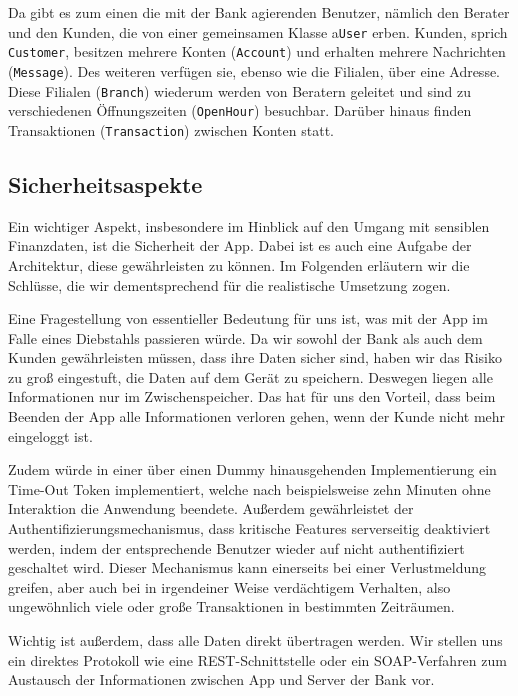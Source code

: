 	
	
	Da gibt es zum einen die mit der Bank agierenden Benutzer, nämlich den Berater und den Kunden, die von einer gemeinsamen Klasse a\texttt{User} erben. Kunden, sprich \texttt{Customer}, besitzen mehrere Konten (\texttt{Account}) und erhalten mehrere Nachrichten (\texttt{Message}). Des weiteren verfügen sie, ebenso wie die Filialen,  über eine Adresse. Diese Filialen (\texttt{Branch}) wiederum werden von Beratern geleitet und sind zu verschiedenen Öffnungszeiten (\texttt{OpenHour}) besuchbar. Darüber hinaus finden Transaktionen (\texttt{Transaction}) zwischen Konten statt.

\subsection{Sicherheitsaspekte}
%
	Ein wichtiger Aspekt, insbesondere im Hinblick auf den Umgang mit sensiblen Finanzdaten, ist die Sicherheit der App. Dabei ist es auch eine Aufgabe der Architektur, diese gewährleisten zu können. Im Folgenden erläutern wir die Schlüsse, die wir dementsprechend für die realistische Umsetzung zogen.
	
	Eine Fragestellung von essentieller Bedeutung für uns ist, was mit der App im Falle eines Diebstahls passieren würde. Da wir sowohl der Bank als auch dem Kunden gewährleisten müssen, dass ihre Daten sicher sind, haben wir das Risiko zu groß eingestuft, die Daten auf dem Gerät zu speichern. Deswegen liegen alle Informationen nur im Zwischenspeicher. Das hat für uns den Vorteil, dass beim Beenden der App alle Informationen verloren gehen, wenn der Kunde nicht mehr eingeloggt ist.
	
	Zudem würde in einer über einen Dummy hinausgehenden Implementierung ein Time-Out Token implementiert, welche nach beispielsweise zehn Minuten ohne Interaktion die Anwendung beendete. Außerdem gewährleistet der Authentifizierungsmechanismus, dass kritische Features serverseitig deaktiviert werden, indem der entsprechende Benutzer wieder auf nicht authentifiziert geschaltet wird. Dieser Mechanismus kann einerseits bei einer Verlustmeldung greifen, aber auch bei in irgendeiner Weise verdächtigem Verhalten, also ungewöhnlich viele oder große Transaktionen in bestimmten Zeiträumen.
	
	Wichtig ist außerdem, dass alle Daten direkt übertragen werden. Wir stellen uns ein direktes Protokoll wie eine \acs{REST}-Schnittstelle oder ein \acs{SOAP}-Verfahren zum Austausch der Informationen zwischen App und Server der Bank vor.
	
